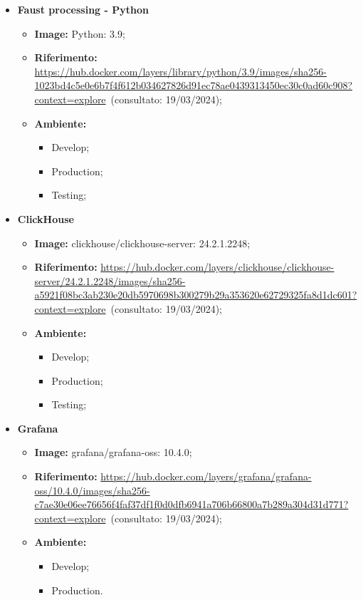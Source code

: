 \begin{itemize}
  \item \textbf{Faust processing - Python} 
    \begin{itemize}
      \item \textbf{Image:} Python: 3.9;
      \item \textbf{Riferimento:} \url{https://hub.docker.com/layers/library/python/3.9/images/sha256-1023bd4c5e0e6b7f4f612b034627826d91ec78ae0439313450ec30c0ad60c908?context=explore}~(consultato: 19/03/2024);
      \item \textbf{Ambiente:}
        \begin{itemize}
          \item Develop;
          \item Production;
          \item Testing;
        \end{itemize}
    \end{itemize}

  \item \textbf{ClickHouse} 
    \begin{itemize}
      \item \textbf{Image:} clickhouse/clickhouse-server: 24.2.1.2248;
      \item \textbf{Riferimento:} \url{https://hub.docker.com/layers/clickhouse/clickhouse-server/24.2.1.2248/images/sha256-a5921f08bc3ab230e20db5970698b300279b29a353620e62729325fa8d1dc601?context=explore}~(consultato: 19/03/2024);
      \item \textbf{Ambiente:}
        \begin{itemize}
          \item Develop;
          \item Production;
          \item Testing;
        \end{itemize}
    \end{itemize}

  \item \textbf{Grafana} 
    \begin{itemize}
      \item \textbf{Image:} grafana/grafana-oss: 10.4.0;
      \item \textbf{Riferimento:} \url{https://hub.docker.com/layers/grafana/grafana-oss/10.4.0/images/sha256-c7ae30e06ee76656f4faf37df1f0d0dfb6941a706b66800a7b289a304d31d771?context=explore}~(consultato: 19/03/2024);
      \item \textbf{Ambiente:}
        \begin{itemize}
          \item Develop;
          \item Production.
        \end{itemize}
    \end{itemize}
\end{itemize}

